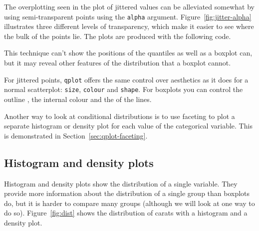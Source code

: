 The overplotting seen in the plot of jittered values can be alleviated somewhat by using semi-transparent points using the {\tt alpha} argument. Figure~\ref{fig:jitter-alpha} illustrates three different levels of transparency, which make it easier to see where the bulk of the points lie.  The plots are produced with the following code. 

% 


This technique can't show the positions of the quantiles as well as a boxplot can, but it may reveal other features of the distribution that a boxplot cannot.

For jittered points, {\tt qplot} offers the same control over aesthetics as it does for a normal scatterplot: {\tt size}, {\tt colour} and {\tt shape}. For boxplots you can control the outline , the internal  colour and the  of the lines.

Another way to look at conditional distributions is to use faceting to plot a separate histogram or density plot for each value of the categorical variable.  This is demonstrated in Section~\ref{sec:qplot-faceting}.

\subsection{Histogram and density plots}\label{sub:distribution}

Histogram and density plots show the distribution of a single variable.  They provide more information about the distribution of a single group than boxplots do, but it is harder to compare many groups (although we will look at one way to do so).  Figure~\ref{fig:dist} shows the distribution of carats with a histogram and a density plot.    

% 


